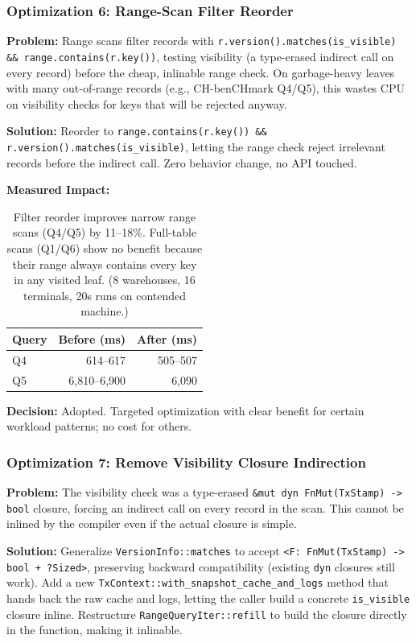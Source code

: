 \documentclass[11pt]{article}
\newcommand{\code}[1]{\texttt{#1}}
\begin{document}
\subsubsection{Optimization 6: Range-Scan Filter Reorder}

\textbf{Problem:}
Range scans filter records with \code{r.version().matches(is\_visible) \&\&
range.contains(r.key())}, testing visibility (a type-erased indirect call on
every record) before the cheap, inlinable range check. On garbage-heavy leaves
with many out-of-range records (e.g., CH-benCHmark Q4/Q5), this wastes CPU on
visibility checks for keys that will be rejected anyway.

\textbf{Solution:}
Reorder to \code{range.contains(r.key()) \&\& r.version().matches(is\_visible)},
letting the range check reject irrelevant records before the indirect call.
Zero behavior change, no API touched.

\textbf{Measured Impact:}

\begin{table}[h]
\centering
\small
\begin{tabular}{lrr}
\toprule
\textbf{Query} & \textbf{Before (ms)} & \textbf{After (ms)} \\
\midrule
Q4 & 614--617 & 505--507 \\
Q5 & 6,810--6,900 & 6,090 \\
\bottomrule
\end{tabular}
\caption{Filter reorder improves narrow range scans (Q4/Q5) by 11--18\%. Full-table scans
(Q1/Q6) show no benefit because their range always contains every key in any visited leaf.
(8 warehouses, 16 terminals, 20s runs on contended machine.)}
\label{tab:filter_reorder}
\end{table}

\textbf{Decision:} Adopted. Targeted optimization with clear benefit for certain
workload patterns; no cost for others.

\subsubsection{Optimization 7: Remove Visibility Closure Indirection}

\textbf{Problem:}
The visibility check was a type-erased \code{\&mut dyn FnMut(TxStamp) -> bool}
closure, forcing an indirect call on every record in the scan. This cannot be
inlined by the compiler even if the actual closure is simple.

\textbf{Solution:}
Generalize \code{VersionInfo::matches} to accept \code{<F: FnMut(TxStamp) -> bool
+ ?Sized>}, preserving backward compatibility (existing \code{dyn} closures still
work). Add a new \code{TxContext::with\_snapshot\_cache\_and\_logs} method that
hands back the raw cache and logs, letting the caller build a concrete \code{is\_visible}
closure inline. Restructure \code{RangeQueryIter::refill} to build the closure
directly in the function, making it inlinable.
\end{document}
